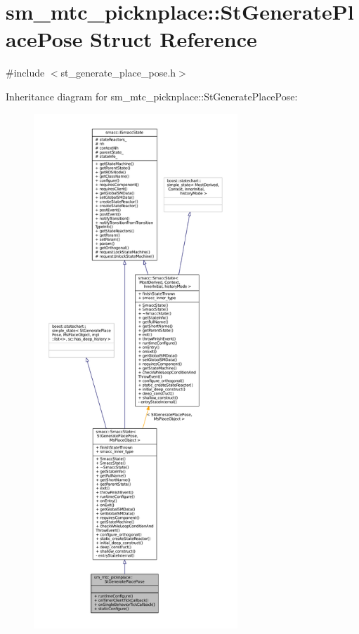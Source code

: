 \hypertarget{structsm__mtc__picknplace_1_1StGeneratePlacePose}{}\section{sm\+\_\+mtc\+\_\+picknplace\+:\+:St\+Generate\+Place\+Pose Struct Reference}
\label{structsm__mtc__picknplace_1_1StGeneratePlacePose}


{\ttfamily \#include $<$st\+\_\+generate\+\_\+place\+\_\+pose.\+h$>$}



Inheritance diagram for sm\+\_\+mtc\+\_\+picknplace\+:\+:St\+Generate\+Place\+Pose\+:
\nopagebreak
\begin{figure}[H]
\begin{center}
\leavevmode
\includegraphics[height=550pt]{structsm__mtc__picknplace_1_1StGeneratePlacePose__inherit__graph}
\end{center}
\end{figure}


